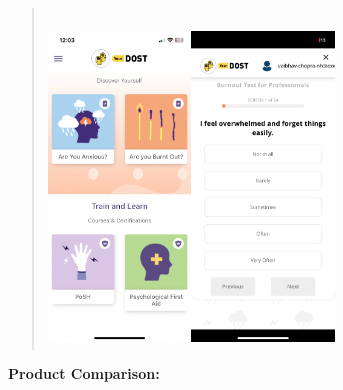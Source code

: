 \documentclass[manuscript,screen,review]{acmart}
\begin{document}
\begin{enumerate}
\begin{quote}
  \strut \\
  \includegraphics[width=1.49474in,height=3.31321in]{vertopal.com_Untitleddocument/vertopal_25c0ff455f73469eb1b6e3e4452807f6/media/image10.png}\includegraphics[width=1.49474in,height=3.31321in]{vertopal.com_Untitleddocument/vertopal_25c0ff455f73469eb1b6e3e4452807f6/media/image5.png}
  \end{quote}
\end{enumerate}

\textbf{Product Comparison:}
\end{document}
